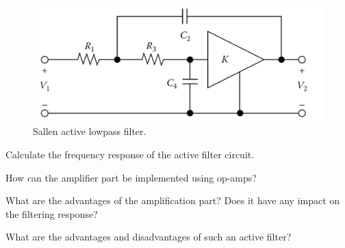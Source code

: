 \documentclass[11pt]{article}
\begin{document}


\begin{question}


    \begin{figure}[H]
        \begin{center}
            \includegraphics[scale=0.3]{Fig/Q5.png}
            \caption{\label{fig:Q5} Sallen active lowpass filter.}
        \end{center}
    \end{figure}

    \begin{subquestion}{Calculate the frequency response of the active filter circuit.}
        \answer{}
    \end{subquestion}
    \begin{subquestion}{How can the amplifier part be implemented using op-amps?}
        \answer{}
    \end{subquestion}
    \begin{subquestion}{What are the advantages of the amplification part? Does it have any impact on the filtering response?}
        \answer{}
    \end{subquestion}
    \begin{subquestion}{What are the advantages and disadvantages of such an active filter?}
        \answer{}
    \end{subquestion}

\end{question}
\end{document}
